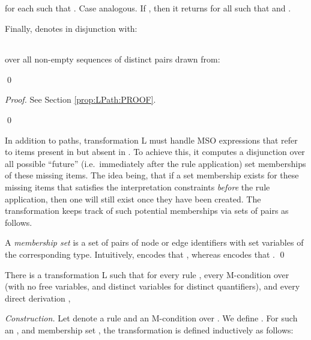 \documentclass{llncs}
\begin{document}
\noindent for each  such that . Case  analogous. If , then it returns  for all  such that  and .

Finally,  denotes  in disjunction with:
\begin{center}
	\begin{tabular}{c}
		\\
		
	\end{tabular}
\end{center}

\noindent over all non-empty sequences of distinct pairs  drawn from:

	\qed
	
\begin{proof}
	See Section \ref{prop:LPath:PROOF}.
	
	\qed
\end{proof}

In addition to paths, transformation L must handle MSO expressions that refer to items present in  but absent in . To achieve this, it computes a disjunction over all possible ``future'' (i.e.\ immediately after the rule application) set memberships of these missing items. The idea being, that if a set membership exists for these missing items that satisfies the interpretation constraints \emph{before} the rule application, then one will still exist once they have been created. The transformation keeps track of such potential memberships via sets of pairs as follows.


\begin{definition}\rm
	A \emph{membership set}  is a set of pairs  of node or edge identifiers  with set variables of the corresponding type. Intuitively,  encodes that , whereas  encodes that .
	\qed
\end{definition}

\begin{theorem}\label{thm:L}\rm
	There is a transformation L such that for every rule , every M-condition  over  (with no free variables, and distinct variables for distinct quantifiers), and every direct derivation ,
	
\end{theorem}
	
	\noindent \emph{Construction.} Let  denote a rule and  an M-condition over . We define . For such an , and membership set , the transformation  is defined inductively as follows:
	
\end{document}
